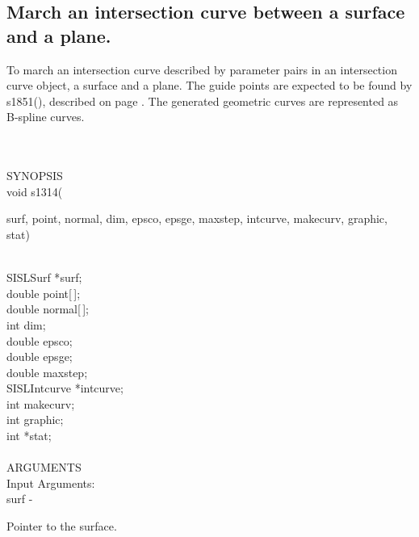 \subsection{March an intersection curve between a surface and a plane.}
\begin{minipg1}
  To march an intersection curve described by parameter pairs in an intersection
  curve object, a surface and a plane.
  The guide points are expected to be found by s1851(), described on
  page \pageref{s1851}.
  The generated geometric curves are represented as B-spline curves.
\end{minipg1} \\ \\
SYNOPSIS\\
        \>void s1314(\begin{minipg3}
                {\fov surf}, {\fov point}, {\fov normal}, {\fov dim}, {\fov epsco}, {\fov epsge}, {\fov maxstep}, {\fov intcurve}, \linebreak
                {\fov makecurv}, {\fov graphic}, {\fov stat})
                \end{minipg3}\\[0.3ex]
                \>\>    SISLSurf        \>      *{\fov surf};\\
                \>\>    double  \>      {\fov point}[\,];\\
                \>\>    double  \>      {\fov normal}[\,];\\
                \>\>    int     \>      {\fov dim};\\
                \>\>    double  \>      {\fov epsco};\\
                \>\>    double  \>      {\fov epsge};\\
                \>\>    double  \>      {\fov maxstep};\\
                \>\>    SISLIntcurve\>  *{\fov intcurve};\\
                \>\>    int     \>      {\fov makecurv};\\
                \>\>    int     \>      {\fov graphic};\\
                \>\>    int     \>      *{\fov stat};\\
\\
ARGUMENTS\\
        \>Input Arguments:\\
        \>\>    {\fov surf}     \> - \> \begin{minipg2}
                                Pointer to the surface.
                                \end{minipg2}\\
